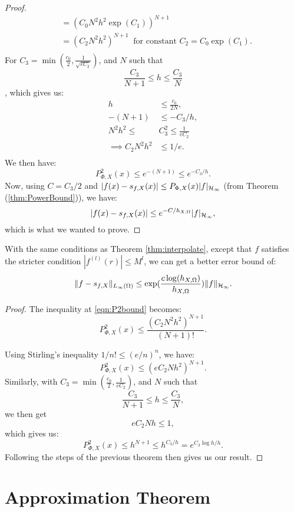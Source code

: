 \documentclass[twoside]{memoir}
\begin{document}
\begin{proof}
\begin{equation}
\begin{split}
	&= (C_0 N^2 h^2\exp(C_1))^{N+1} \\
	&= (C_2 N^2 h^2)^{N+1} ~ \text{ for constant }C_2 = C_0\exp(C_1). \\
	\end{split}
	\end{equation}
	For $C_3 = \min(\frac{c_0}{2}, \frac{1}{\sqrt{e C_2}})$, and $N$ such that
	\[ \frac{C_3}{N+1} \leq h \leq \frac{C_3}{N} \], which gives us:
	\begin{equation*}
	\begin{split}
	h &\leq \frac{c_0}{2N}, \\
	-(N+1) &\leq -C_3/h, \\
	N^2h^2 \leq &C_3^2 \leq \frac{1}{eC_2} \\
	\implies C_2N^2h^2 &\leq  1/e. \\
	\end{split}
	\end{equation*}
	We then have:
	\begin{equation*}
	P^2_{\Phi, X}(x) \leq e^{-(N+1)} \leq e^{-C_3/h}. 
	\end{equation*}
	Now, using $C= C_3/2$ and $|f(x) - s_{f, X}(x)| \leq P_{\Phi, X}(x) |f|_{\mathcal{H}_\infty}$ (from Theorem (\ref{thm:PowerBound})), we have:
	\[ |f(x) - s_{f, X}(x)| \leq e^{-C/h_{X,\Omega}} |f|_{\mathcal{H}_\infty}, \]
	which is what we wanted to prove.
\end{proof}

\begin{thm}
	With the same conditions as Theorem \ref{thm:interpolate}, except that $f$ satisfies the stricter condition $|f^{(l)}(r)| \leq M^l$, we can get a better error bound of:
	\[ \lVert f - s_{f,X}\rVert_{L_\infty(\Omega)} \leq \exp(\frac{c \log(h_{X,\Omega})}{h_{X,\Omega}})\lVert f\rVert_{\mathcal{H}_\infty}. \]
\end{thm}
\begin{proof}
	The inequality at \ref{eqn:P2bound} becomes:
	\[ P^2_{\Phi, X}(x) \leq  \frac{(C_2 N^2 h^2)^{N+1}}{(N+1)!}. \]
	
	Using Stirling's inequality $1/n! \leq (e/n)^n$, we have:
	\[ P^2_{\Phi, X}(x) \leq (eC_2 N h^2)^{N+1}. \]
	Similarly, with $C_3 = \min(\frac{c_0}{2}, \frac{1}{e C_2})$, and $N$ such that
	\[ \frac{C_3}{N+1} \leq h \leq \frac{C_3}{N}, \] we then get \[ eC_2Nh \leq 1, \] which gives us:
	\[ P^2_{\Phi,X}(x) \leq h^{N+1} \leq h^{C_3/h} = e^{C_3 \log h / h}. \]
	Following the steps of the previous theorem then gives us our result.
\end{proof}
\section{Approximation Theorem} \label{sec:AppThm}
\end{document}
